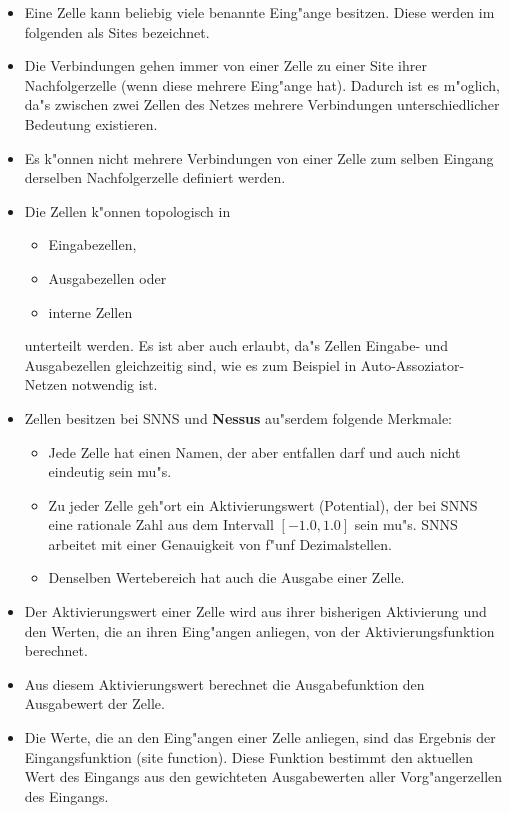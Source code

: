 \begin{itemize}
  \item Eine Zelle kann beliebig viele benannte Eing"ange besitzen.
        Diese werden im folgenden als Sites bezeichnet.
  \item Die Verbindungen gehen immer von einer Zelle
	zu einer Site ihrer Nachfolgerzelle  
        (wenn diese mehrere Eing"ange hat). Dadurch ist es m"oglich,
	da"s zwischen zwei Zellen des Netzes mehrere Verbindungen 
	unterschiedlicher Bedeutung existieren.
  \item Es k"onnen nicht mehrere Verbindungen von einer Zelle zum
	selben Eingang derselben Nachfolgerzelle definiert werden.
  \item Die Zellen k"onnen topologisch in
	\begin{itemize}
          \item Eingabezellen,
          \item Ausgabezellen oder
          \item interne Zellen
        \end{itemize}
	unterteilt werden. Es ist aber auch erlaubt, da"s Zellen
	Eingabe- und Ausgabezellen gleichzeitig sind, wie es zum 
	Beispiel in Auto-Assoziator-Netzen 
        notwendig ist.
  \item Zellen besitzen bei SNNS und {\bf Nessus}
	au"serdem folgende Merkmale:
	\begin{itemize}
          \item Jede Zelle hat einen Namen, der aber entfallen darf
		und auch nicht eindeutig sein mu"s.
          \item Zu jeder Zelle geh"ort ein Aktivierungswert
(Potential), der bei SNNS eine 
                rationale Zahl aus dem Intervall $[-1.0,1.0]$ sein
mu"s. SNNS arbeitet mit  
                einer Genauigkeit von f"unf Dezimalstellen. 
          \item Denselben Wertebereich hat auch die Ausgabe einer Zelle.
        \end{itemize}  
  \item Der Aktivierungswert einer Zelle wird aus ihrer bisherigen
Aktivierung und 
                den Werten, die an ihren Eing"angen anliegen, von der
Aktivierungsfunktion   
                berechnet.
  \item Aus diesem Aktivierungswert berechnet die Ausgabefunktion den Ausgabewert
                der Zelle.
  \item Die Werte, die an den Eing"angen einer Zelle anliegen, sind das Ergebnis
                der Eingangsfunktion (site function). Diese Funktion bestimmt den aktuellen
                Wert des Eingangs aus den gewichteten Ausgabewerten aller Vorg"angerzellen
                des Eingangs.
\end{itemize}


